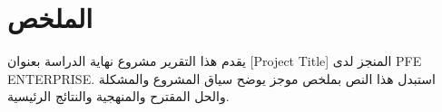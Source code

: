 \chapter*{\textarabic{الملخص}}
\begin{otherlanguage}{arabic}
يقدم هذا التقرير مشروع نهاية الدراسة بعنوان \textenglish{[Project Title]} المنجز لدى \textenglish{PFE ENTERPRISE}. استبدل هذا النص بملخص موجز يوضح سياق المشروع والمشكلة والحل المقترح والمنهجية والنتائج الرئيسية.
\end{otherlanguage}
